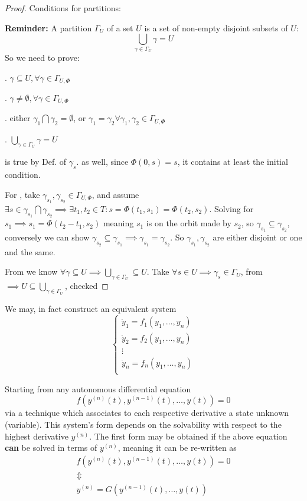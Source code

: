 \begin{proof}
	Conditions for partitions:
	\par \textbf{Reminder:} A partition $\Gamma_U$ of a set $U$ is a set of non-empty disjoint subsets of $U$:
	\[
		\bigcup_{\gamma\in \Gamma_U} \gamma = U
	\]
	So we need to prove:

	. $\gamma \subseteq U, \forall \gamma \in \Gamma_{U,\Phi}$ \par
	. $ \gamma \neq \emptyset, \forall \gamma \in \Gamma_{U,\Phi}$ \par
	. either $\gamma_1 \bigcap \gamma_2 = \emptyset$, or $ \gamma_1 = \gamma_2 \forall \gamma_1, \gamma_2 \in \Gamma_{U,\Phi}$ \par
	. $\bigcup_{\gamma\in \Gamma_U} \gamma = U$ \par

	 is true by Def. of $\gamma_s$.  as well, since $\Phi(0,s) = s$, it contains at least the initial condition.

	For , take $\gamma_{s_1}, \gamma_{s_2} \in \Gamma_{U, \Phi}$, and assume $\exists s \in \gamma_{s_1} \bigcap \gamma_{s_2} \implies \exists t_1,t_2 \in T : s = \Phi(t_1,s_1) = \Phi(t_2, s_2)$. Solving for $s_1 \implies s_1 = \Phi(t_2-t_1, s_2)$ meaning $s_1$ is on the orbit made by $s_2$, so $\gamma_{s_1} \subseteq \gamma_{s_2}$, conversely we can show $\gamma_{s_2} \subseteq \gamma_{s_1} \implies \gamma_{s_1} = \gamma_{s_2}$. So $\gamma_{s_1}, \gamma_{s_2}$ are either disjoint or one and the same.

	From  we know $\forall \gamma \subseteq U \implies \bigcup_{\gamma\in \Gamma_U} \subseteq U$. Take $\forall s \in U \implies \gamma_s \in \Gamma_U$, from  $\implies U \subseteq \bigcup_{\gamma\in \Gamma_U}$,  checked
\end{proof}

We may, in fact construct an equivalent system
\[
	\begin{cases}
		\dot{y}_1 = f_1(y_1,\dots, y_n) \\
		\dot{y}_2 = f_2(y_1,\dots, y_n) \\
		\vdots                          \\
		\dot{y}_n = f_n(y_1,\dots, y_n) \\
	\end{cases}
\]

Starting from any autonomous differential equation
\[
	f(y^{(n)}(t), y^{(n-1)}(t), \dots, y(t))= 0
\]
via a technique which associates to each respective derivative a state unknown (variable). \cite{eigensteve}
This system's form depends on the solvability with respect to the highest derivative $y^{(n)}$.
The first form may be obtained if the above equation \textbf{can} be solved in terms of $y^{(n)}$, meaning it can be re-written as
\begin{gather*}
	f(y^{(n)}(t), y^{(n-1)}(t), \dots, y(t))= 0 \\
	\Updownarrow \\
	y^{(n)}  = G(y^{(n-1)}(t), \dots, y(t))
\end{gather*}

